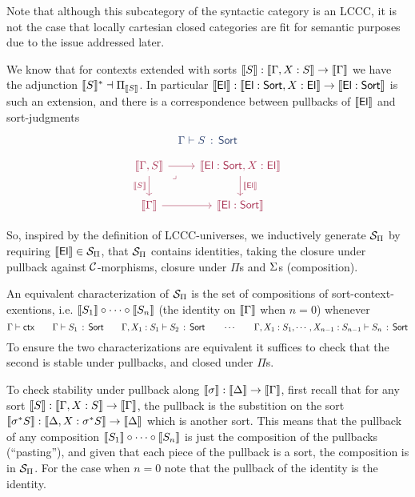 Note that although this subcategory of the syntactic category is an LCCC,
it is not the case that locally cartesian closed categories are
fit for semantic purposes due to the  issue addressed later.

We know that for contexts extended with sorts $\llbracket S \rrbracket : \llbracket \Gamma,X : S \rrbracket \to \llbracket \Gamma \rrbracket$
we have the adjunction $\llbracket S \rrbracket^{*} \dashv \Pi_{\llbracket S \rrbracket}$.
In particular $\llbracket \mathsf{El} \rrbracket : \llbracket \mathsf{El} : \mathsf{Sort},X : \mathsf{El} \rrbracket \to \llbracket \mathsf{El} : \mathsf{Sort} \rrbracket$
is such an extension, and there is a correspondence between pullbacks of $\llbracket \mathsf{El} \rrbracket$
and sort-judgments

\begin{multicols}{2}
  \[\color{syntax} \ObjJdg{\Ga}{S}{\SortCS}\]

  \[ \color{semantics}
    \begin{tikzcd}
      {\bbrkt{\Ga,S}} & {\bbrkt{\ElCS : \SortCS,X : \ElCS}} \\
      {\bbrkt{\Ga}} & {\bbrkt{\ElCS : \SortCS}}
      \arrow[from=1-1, to=1-2]
      \arrow["{\bbrkt{\ElCS}}", from=1-2, to=2-2]
      \arrow[from=2-1, to=2-2]
      \arrow["\bbrkt{S}"', from=1-1, to=2-1]
      \arrow["\lrcorner"{anchor=center, pos=0.125}, draw=none, from=1-1, to=2-2]
    \end{tikzcd}
    \]
\end{multicols}

So, inspired by the definition of LCCC-universes,
we inductively generate $\mathcal{S}_{\Pi}$ by requiring $\llbracket \mathsf{El} \rrbracket \in \mathcal{S}_{\Pi}$,
that $\mathcal{S}_{\Pi}$ contains identities,
taking the closure under pullback against $\mathcal{C}$-morphisms,
closure under $\Pi$s and $\Sigma$s (composition).

An equivalent characterization of $\mathcal{S}_{\Pi}$ is the set of
compositions of sort-context-exentions,
i.e. $\llbracket S_{1} \rrbracket \circ \cdots \circ \llbracket S_{n} \rrbracket$
(the identity on $\llbracket \Gamma \rrbracket$ when $n = 0$)
whenever
\[ \Gamma \vdash \mathsf{ctx} \quad \quad \Gamma \vdash S_{1} \, : \, \mathsf{Sort} \quad \quad \Gamma,X_{1} : S_{1} \vdash S_{2} \, : \, \mathsf{Sort} \quad \quad
   \cdots \quad \quad \Gamma,X_{1} : S_{1}, \cdots ,X_{n-1} : S_{n-1} \vdash S_{n} \, : \, \mathsf{Sort}\]
To ensure the two characterizations are equivalent
it suffices to check that the second is stable under pullbacks, and closed under $\Pi$s.

To check stability under pullback along $\llbracket \sigma \rrbracket : \llbracket \Delta \rrbracket \to \llbracket \Gamma \rrbracket$,
first recall that for any sort $\llbracket S \rrbracket : \llbracket \Gamma,X : S \rrbracket \to \llbracket \Gamma \rrbracket$,
the pullback is the substition on the sort $\llbracket \sigma^{*}S \rrbracket : \llbracket \Delta,X : \sigma^{*}S \rrbracket \to \llbracket \Delta \rrbracket$
which is another sort.
This means that the pullback of any composition $\llbracket S_{1} \rrbracket \circ \cdots \circ \llbracket S_{n} \rrbracket$
is just the composition of the pullbacks (``pasting''),
and given that each piece of the pullback is a sort,
the composition is in $\mathcal{S}_{\Pi}$.
For the case when $n = 0$ note that the pullback of the identity is the identity.

